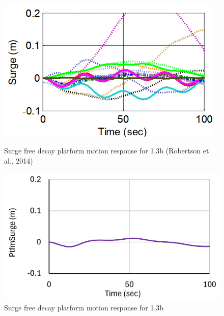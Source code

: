 \documentclass[a4paper, 11pt]{article}
\begin{document}
\begin{figure}[H]
    \begin{minipage}{0.47\textwidth}
        \centering
        \includegraphics[width=0.97\textwidth]{1.3b_surge.png}
        \caption{\small Surge free decay platform motion response for 1.3b (Robertson et al., 2014)}
        \label{fig:1.3b_surge}
    \end{minipage}
    \hfill
    \begin{minipage}{0.5\textwidth}
        \centering
        \includegraphics[width=1\textwidth]{1.3b_surge_mine.png}
        \caption{\small Surge free decay platform motion response for 1.3b}
        \label{fig:1.3b_surge_mine}
    \end{minipage}
\end{figure}
\end{document}
